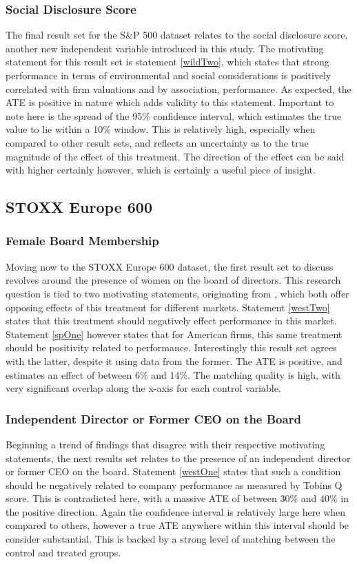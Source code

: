 \subsubsection{Social Disclosure Score}
{The final result set for the S\&P 500 dataset relates to the social disclosure score, another new independent variable introduced in this study. The motivating statement for this result set is statement \ref{wildTwo}, which states that strong performance in terms of environmental and social considerations is positively correlated with firm valuations and by association, performance. As expected, the ATE is positive in nature which adds validity to this statement. Important to note here is the spread of the 95\% confidence interval, which estimates the true value to lie within a 10\% window. This is relatively high, especially when compared to other result sets, and reflects an uncertainty as to the true magnitude of the effect of this treatment. The direction of the effect can be said with higher certainly however, which is certainly a useful piece of insight. }
\subsection{STOXX Europe 600}
\subsubsection{Female Board Membership}
{Moving now to the STOXX Europe 600 dataset, the first result set to discuss revolves around the presence of women on the board of directors. This research question is tied to two motivating statements, originating from \cite{moldovan2015learning}, which both offer opposing effects of this treatment for different markets. Statement \ref{westTwo} states that this treatment should negatively effect performance in this market. Statement \ref{spOne} however states that for American firms, this same treatment should be positivity related to performance. Interestingly this result set agrees with the latter, despite it using data from the former. The ATE is positive, and estimates an effect of between 6\% and 14\%. The matching quality is high, with very significant overlap along the x-axis for each control variable.}
\subsubsection{Independent Director or Former CEO on the Board}
{Beginning a trend of findings that disagree with their respective motivating statements, the next results set relates to the presence of an independent director or former CEO on the board. Statement \ref{westOne} states that such a condition should be negatively related to company performance as measured by Tobins Q score. This is contradicted here, with a massive ATE of between 30\% and 40\% in the positive direction. Again the confidence interval is relatively large here when compared to others, however a true ATE anywhere within this interval should be consider substantial. This is backed by a strong level of matching between the control and treated groups. }
